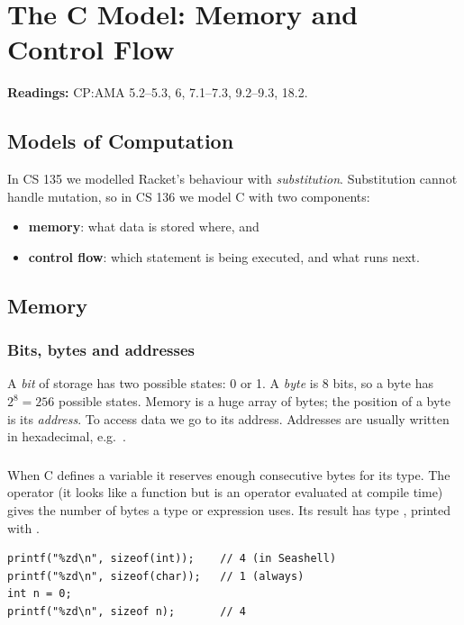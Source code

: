 \chapter{The C Model: Memory and Control Flow}

\textbf{Readings:} CP:AMA 5.2--5.3, 6, 7.1--7.3, 9.2--9.3, 18.2.

\section{Models of Computation}

In CS 135 we modelled Racket's behaviour with \emph{substitution}. Substitution cannot handle
mutation, so in CS 136 we model C with two components:
\begin{itemize}
  \item \textbf{memory}: what data is stored where, and
  \item \textbf{control flow}: which statement is being executed, and what runs next.
\end{itemize}

\section{Memory}

\subsection{Bits, bytes and addresses}

A \emph{bit} of storage has two possible states: 0 or 1. A \emph{byte} is 8 bits, so a byte has
$2^8 = 256$ possible states. Memory is a huge array of bytes; the position of a byte is its
\emph{address}. To access data we go to its address. Addresses are usually written in
hexadecimal, e.g.\ .

\subsection{}

When C defines a variable it reserves enough consecutive bytes for its type. The 
operator (it looks like a function but is an operator evaluated at compile time) gives the number
of bytes a type or expression uses. Its result has type , printed with .
\begin{lstlisting}[style=c]
printf("%zd\n", sizeof(int));    // 4 (in Seashell)
printf("%zd\n", sizeof(char));   // 1 (always)
int n = 0;
printf("%zd\n", sizeof n);       // 4
\end{lstlisting}

